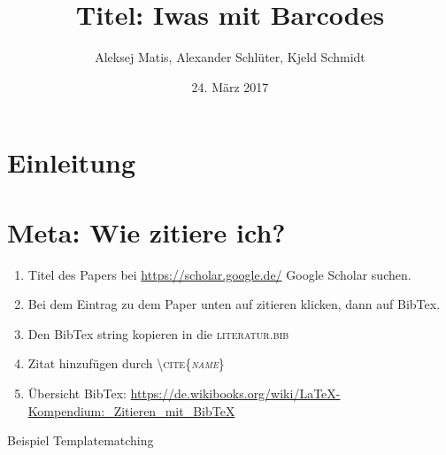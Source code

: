 \documentclass[12pt,a4paper]{article}
\author{Aleksej Matis, Alexander Schlüter, Kjeld Schmidt}
\title{Titel: Iwas mit Barcodes}
\date{24. März 2017}
\begin{document}

\setcounter{page}{0}
\maketitle
\thispagestyle{empty} 
\tableofcontents
\newpage
\section{Einleitung} 


\newpage
\section{Meta: Wie zitiere ich?} 
\begin{enumerate}
\item Titel des Papers bei \url{https://scholar.google.de/} Google Scholar suchen.
\item Bei dem Eintrag zu dem Paper unten auf zitieren klicken, dann auf BibTex.
\item Den BibTex string kopieren in die \textsc{literatur.bib}
\item Zitat hinzufügen durch \textsc{\textbackslash cite\{\textit{name}\}}
\item Übersicht BibTex: \url{https://de.wikibooks.org/wiki/LaTeX-Kompendium:_Zitieren_mit_BibTeX}
\end{enumerate}
Beispiel Templatematching \cite{chen2014scanning}
%

%

\newpage
\appendix
\begin{small}


\end{small}
\end{document}
